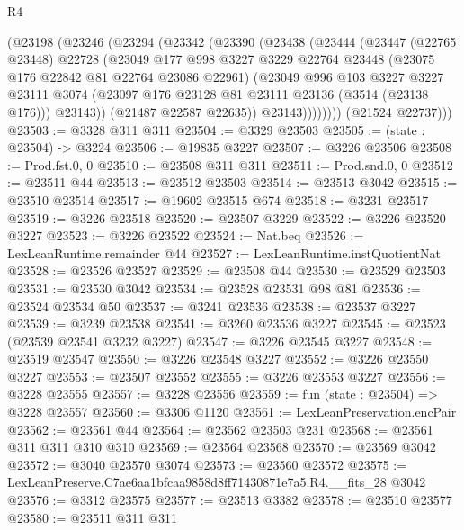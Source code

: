 \begin{lexlean}{R4}
\begin{coremodule}
          (@23198
            (@23246
              (@23294
                (@23342
                  (@23390
                    (@23438
                      (@23444
                        (@23447
                          (@22765 @23448)
                          @22728
                          (@23049
                            @177
                            @998
                            @3227
                            @3229
                            @22764
                            @23448
                            (@23075 @176 @22842 @81 @22764 @23086 @22961)
                            (@23049
                              @996
                              @103
                              @3227
                              @3227
                              @23111
                              @3074
                              (@23097 @176 @23128 @81 @23111 @23136 (@3514 (@23138 @176)))
                              @23143))
                          (@21487 @22587 @22635))
                        @23143))))))))
        (@21524 @22737)))
@23503 := @3328 @311 @311
@23504 := @3329 @23503
@23505 := (state : @23504) -> @3224
@23506 := @19835 @3227
@23507 := @3226 @23506
@23508 := Prod.fst.{0, 0}
@23510 := @23508 @311 @311
@23511 := Prod.snd.{0, 0}
@23512 := @23511 @44
@23513 := @23512 @23503
@23514 := @23513 @3042
@23515 := @23510 @23514
@23517 := @19602 @23515 @674
@23518 := @3231 @23517
@23519 := @3226 @23518
@23520 := @23507 @3229
@23522 := @3226 @23520 @3227
@23523 := @3226 @23522
@23524 := Nat.beq
@23526 := LexLeanRuntime.remainder @44
@23527 := LexLeanRuntime.instQuotientNat
@23528 := @23526 @23527
@23529 := @23508 @44
@23530 := @23529 @23503
@23531 := @23530 @3042
@23534 := @23528 @23531 @98 @81
@23536 := @23524 @23534 @50
@23537 := @3241 @23536
@23538 := @23537 @3227
@23539 := @3239 @23538
@23541 := @3260 @23536 @3227
@23545 := @23523 (@23539 @23541 @3232 @3227)
@23547 := @3226 @23545 @3227
@23548 := @23519 @23547
@23550 := @3226 @23548 @3227
@23552 := @3226 @23550 @3227
@23553 := @23507 @23552
@23555 := @3226 @23553 @3227
@23556 := @3228 @23555
@23557 := @3228 @23556
@23559 := fun (state : @23504) => @3228 @23557
@23560 := @3306 @1120
@23561 := LexLeanPreservation.encPair
@23562 := @23561 @44
@23564 := @23562 @23503 @231
@23568 := @23561 @311 @311 @310 @310
@23569 := @23564 @23568
@23570 := @23569 @3042
@23572 := @3040 @23570 @3074
@23573 := @23560 @23572
@23575 := LexLeanPreserve.C7ae6aa1bfcaa9858d8ff71430871e7a5.R4.__fits_28 @3042
@23576 := @3312 @23575
@23577 := @23513 @3382
@23578 := @23510 @23577
@23580 := @23511 @311 @311

\end{coremodule}
\end{lexlean}
